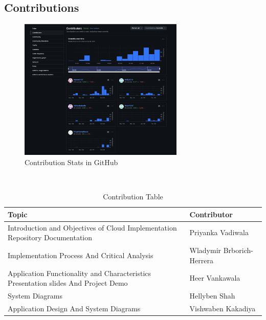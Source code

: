 \documentclass{llncs}
\begin{document}
\subsection{Contributions}
\begin{figure}[htbp]
    \centering
    \includegraphics[width=0.7\textwidth]{../images/contributions.png}
    \vspace{0.01\textwidth}
    \caption{Contribution Stats in GitHub}
    \label{fig:contributions}
\end{figure}

\vphantom{}\\

\begin{table}[htbp]

    \begin{tabular}{|p{}|p{}|}
        \hline
        \textbf{Topic}    & \textbf{Contributor}      \\
        \hline
        Introduction and Objectives of Cloud Implementation  \newline
        Repository Documentation & Priyanka Vadiwala         \\
        \hline
        Implementation Process  And Critical Analysis
                       & Wladymir Brborich-Herrera \\
        \hline
        Application Functionality and Characteristics  \newline
        Presentation slides And Project Demo     & Heer Vankawala            \\
        \hline
        System Diagrams        & Hellyben Shah             \\
        \hline
        Application Design And System Diagrams              & Vishwaben Kakadiya        \\
        \hline
    \end{tabular}
    \caption{Contribution Table}
    \label{tab:contribution}
\end{table}
\end{document}
